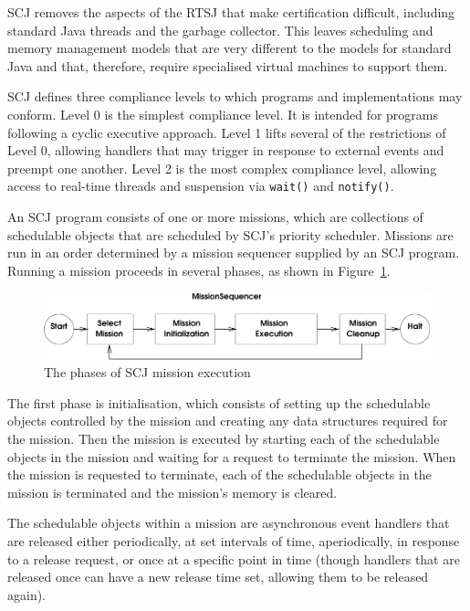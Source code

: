 SCJ removes the aspects of the RTSJ that make certification difficult,
including standard Java threads and the garbage collector.
This leaves scheduling and memory management models that are very
different to the models for standard Java and that, therefore, require
specialised virtual machines to support them.

SCJ defines three compliance levels to which programs and
implementations may conform.
Level 0 is the simplest compliance level.
It is intended for programs following a cyclic executive approach.
Level 1 lifts several of the restrictions of Level 0, allowing
handlers that may trigger in response to external events and preempt
one another.
Level 2 is the most complex compliance level, allowing access to
real-time threads and suspension via \texttt{wait()} and
\texttt{notify()}.  

An SCJ program consists of one or more missions, which are collections
of schedulable objects that are scheduled by SCJ's priority scheduler.
Missions are run in an order determined by a mission sequencer
supplied by an SCJ program.
Running a mission proceeds in several phases, as shown in
Figure~\ref{phases-diagram}.

\begin{figure}[ht]
  \includegraphics[width=\textwidth]{phases.pdf}
  \caption{\protect{}The phases of SCJ mission execution}
  \label{phases-diagram}
\end{figure}

The first phase is initialisation, which consists of setting up the
schedulable objects controlled by the mission and creating any data
structures required for the mission.
Then the mission is executed by starting each of the schedulable
objects in the mission and waiting for a request to terminate the
mission.
When the mission is requested to terminate, each of the schedulable
objects in the mission is terminated and the mission's memory is
cleared.

The schedulable objects within a mission are asynchronous event
handlers that are released either periodically, at set intervals of
time, aperiodically, in response to a release request, or once at a
specific point in time (though handlers that are released once can
have a new release time set, allowing them to be released again).
%
%

